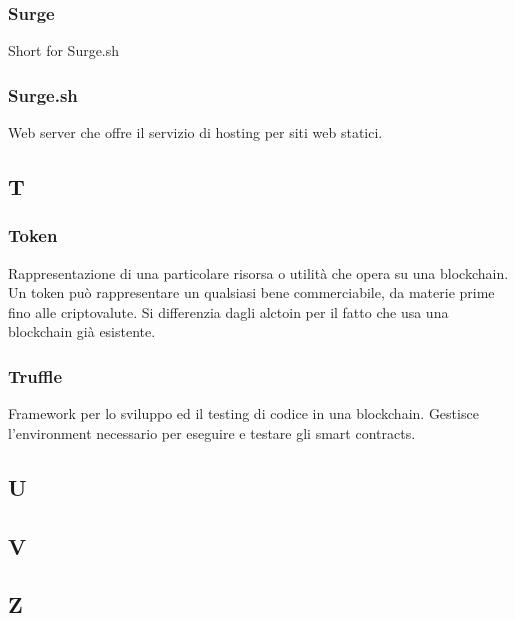 \subsubsection*{Surge}
Short for Surge.sh

\subsubsection*{Surge.sh}
Web server che offre il servizio di hosting per siti web statici.


\subsection*{T}

\subsubsection*{Token}
Rappresentazione di una particolare risorsa o utilità che opera su una blockchain\glo. Un token può rappresentare un qualsiasi bene commerciabile, da materie prime fino alle criptovalute. Si differenzia dagli alctoin per il fatto che usa una blockchain già esistente.

\subsubsection*{Truffle}
Framework per lo sviluppo ed il testing di codice in una blockchain\glo. Gestisce l'environment necessario per eseguire e testare gli smart contracts\glo.


\subsection*{U}

\subsection*{V}

\subsection*{Z}
